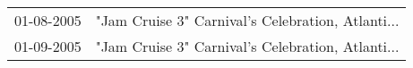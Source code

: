 \begin{supertabular}{ll}
 01-08-2005 &  "Jam Cruise 3" Carnival's Celebration, Atlanti... \\
 01-09-2005 &  "Jam Cruise 3" Carnival's Celebration, Atlanti... \\
\end{supertabular}
